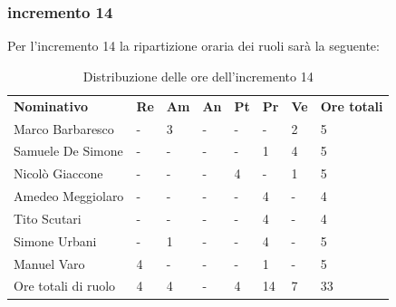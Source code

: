 \subsubsection{incremento 14}
Per l'incremento 14 la ripartizione oraria dei ruoli sarà la seguente:
\begin{center}
    \begin{table}[ht!]
        \centering
        \caption{Distribuzione delle ore dell'incremento 14}
        \vspace{5px}
        \renewcommand{\arraystretch}{1.8}
        \begin{tabular}{p{100px} p{20px} p{20px} p{20px} p{20px} p{20px} p{20px} p{50px} }
            \rowcolor{logo!70} \textbf{Nominativo} & \textbf{Re} & \textbf{Am} & \textbf{An} & \textbf{Pt} & \textbf{Pr} & \textbf{Ve} & \textbf{Ore totali} \\
            Marco Barbaresco                       & -           & 3           & -           & -           & -           & 2           & 5                   \\
            Samuele De Simone                      & -           & -           & -           & -           & 1           & 4           & 5                   \\
            Nicolò Giaccone                        & -           & -           & -           & 4           & -           & 1           & 5                   \\
            Amedeo Meggiolaro                      & -           & -           & -           & -           & 4           & -           & 4                   \\
            Tito Scutari                           & -           & -           & -           & -           & 4           & -           & 4                   \\
            Simone Urbani                          & -           & 1           & -           & -           & 4           & -           & 5                   \\
            Manuel Varo                            & 4           & -           & -           & -           & 1           & -           & 5                   \\
            Ore totali di ruolo                    & 4           & 4           & -           & 4           & 14          & 7           & 33                  \\
        \end{tabular}
    \end{table}
\end{center}
